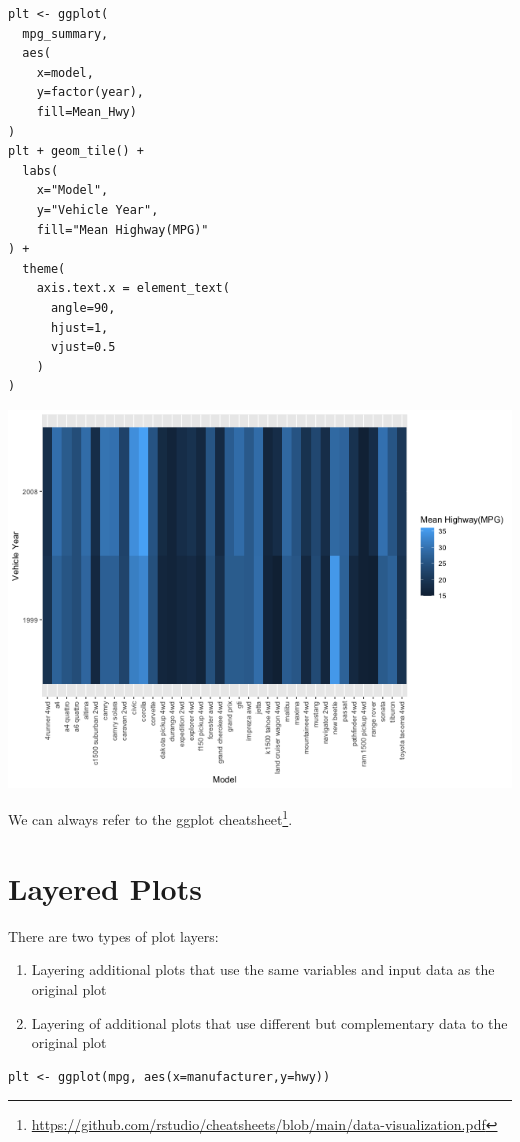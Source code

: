 \documentclass[11pt]{article}
\begin{document}
\begin{verbatim}
plt <- ggplot(
  mpg_summary,
  aes(
    x=model,
    y=factor(year),
    fill=Mean_Hwy)
)
plt + geom_tile() +
  labs(
    x="Model",
    y="Vehicle Year",
    fill="Mean Highway(MPG)"
) +
  theme(
    axis.text.x = element_text(
      angle=90,
      hjust=1,
      vjust=0.5
    )
)
\end{verbatim}

\begin{org}
\begin{center}
\includegraphics[width=.9\linewidth]{./resources/mpg_heatmap2.png}
\end{center}
\end{org}

We can always refer to the ggplot cheatsheet\footnote{\url{https://github.com/rstudio/cheatsheets/blob/main/data-visualization.pdf}}.

\section{Layered Plots}
\label{sec:orga893155}

There are two types of plot layers:

\begin{enumerate}
\item Layering additional plots that use the same variables and input data as the original plot
\item Layering of additional plots that use different but complementary data to the original plot
\end{enumerate}

\begin{verbatim}
plt <- ggplot(mpg, aes(x=manufacturer,y=hwy))
\end{verbatim}
\end{document}

